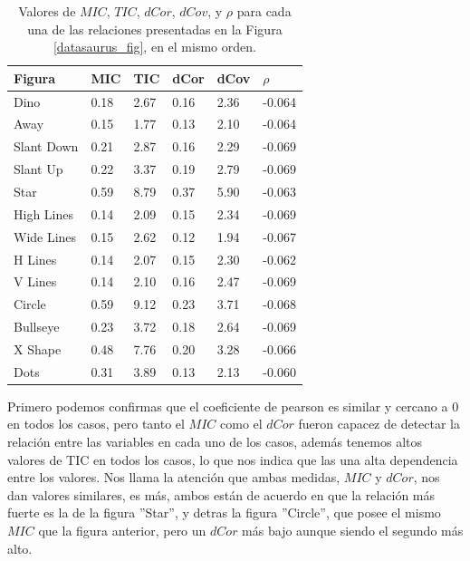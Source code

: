     \begin{table}
        \label{tab:datsaurus}
        \centering
        \begin{tabular}{|l|lllll|}\hline
        Figura     & MIC  & TIC  & dCor & dCov & $\rho $   \\\hline
        Dino       & 0.18 & 2.67 & 0.16 & 2.36 & -0.064 \\
        Away       & 0.15 & 1.77 & 0.13 & 2.10 & -0.064 \\
        Slant Down & 0.21 & 2.87 & 0.16 & 2.29 & -0.069 \\
        Slant Up   & 0.22 & 3.37 & 0.19 & 2.79 & -0.069 \\
        Star       & 0.59 & 8.79 & 0.37 & 5.90 & -0.063 \\
        High Lines & 0.14 & 2.09 & 0.15 & 2.34 & -0.069 \\
        Wide Lines & 0.15 & 2.62 & 0.12 & 1.94 & -0.067 \\
        H Lines    & 0.14 & 2.07 & 0.15 & 2.30 & -0.062 \\
        V Lines    & 0.14 & 2.10 & 0.16 & 2.47 & -0.069 \\
        Circle     & 0.59 & 9.12 & 0.23 & 3.71 & -0.068 \\
        Bullseye   & 0.23 & 3.72 & 0.18 & 2.64 & -0.069 \\
        X Shape    & 0.48 & 7.76 & 0.20 & 3.28 & -0.066 \\
        Dots       & 0.31 & 3.89 & 0.13 & 2.13 & -0.060 \\\hline
        \end{tabular}
        \caption{Valores de $MIC$, $TIC$, $dCor$, $dCov$, y $\rho$ para cada una de las relaciones presentadas en la Figura \ref{datasaurus_fig}, en el mismo orden.}
    \end{table}
        

        

    Primero podemos confirmas que el coeficiente de pearson es similar y cercano a 0 en todos los casos, pero tanto el $MIC$ como el $dCor$ fueron capacez de detectar la relaci\'on entre las variables en cada uno de los casos, adem\'as tenemos altos valores de TIC en todos los casos, lo que nos indica que las una alta dependencia entre los valores. Nos llama la atenci\'on que ambas medidas, $MIC$ y $dCor$, nos dan valores similares, es m\'as, ambos est\'an de acuerdo en que la relaci\'on m\'as fuerte es la de la figura ''Star'', y detras la figura ''Circle'', que posee el mismo $MIC$ que la figura anterior, pero un $dCor$ m\'as bajo aunque siendo el segundo m\'as alto. 